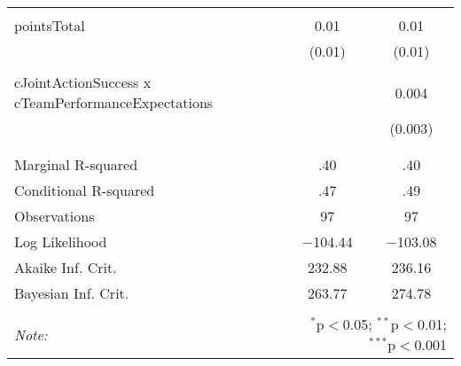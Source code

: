 \begin{table}[!htbp]
\begin{tabular}{@{\extracolsep{5pt}}lcc}
  & & \\ 
 pointsTotal & 0.01 & 0.01 \\ 
  & (0.01) & (0.01) \\ 
  & & \\ 
 cJointActionSuccess x cTeamPerformanceExpectations &  & 0.004 \\ 
  &  & (0.003) \\ 
  & & \\ 
\hline \\[-1.8ex] 
Marginal R-squared & .40 & .40 \\ 
Conditional R-squared & .47 & .49 \\ 
Observations & 97 & 97 \\ 
Log Likelihood & $-$104.44 & $-$103.08 \\ 
Akaike Inf. Crit. & 232.88 & 236.16 \\ 
Bayesian Inf. Crit. & 263.77 & 274.78 \\ 
\hline 
\hline \\[-1.8ex] 
\textit{Note:}  & \multicolumn{2}{r}{$^{*}$p$<$0.05; $^{**}$p$<$0.01; $^{***}$p$<$0.001} \\ 
\end{tabular} 
\end{table} 
